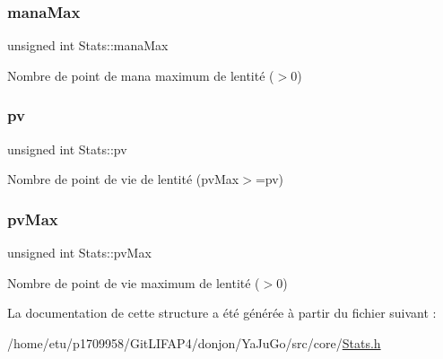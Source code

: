 \subsubsection{\texorpdfstring{mana\+Max}{manaMax}}
{\footnotesize\ttfamily unsigned int Stats\+::mana\+Max}

Nombre de point de mana maximum de l\textquotesingle{}entité ($>$0) \mbox{\label{structStats_a1c5b71cc5cf5a331316fd8c29d89543c}} 
\subsubsection{\texorpdfstring{pv}{pv}}
{\footnotesize\ttfamily unsigned int Stats\+::pv}

Nombre de point de vie de l\textquotesingle{}entité (pv\+Max$>$=pv) \mbox{\label{structStats_a726bf4ece79dacd7ea3efc78843c6fdc}} 
\subsubsection{\texorpdfstring{pv\+Max}{pvMax}}
{\footnotesize\ttfamily unsigned int Stats\+::pv\+Max}

Nombre de point de vie maximum de l\textquotesingle{}entité ($>$0) 

La documentation de cette structure a été générée à partir du fichier suivant \+:\begin{DoxyCompactItemize}
\item 
/home/etu/p1709958/\+Git\+L\+I\+F\+A\+P4/donjon/\+Ya\+Ju\+Go/src/core/\mbox{\hyperlink{Stats_8h}{Stats.\+h}}\end{DoxyCompactItemize}
